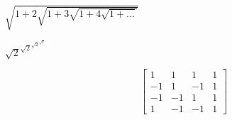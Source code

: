 \documentclass{article}
\begin{document}
	
	$\sqrt{1+2\sqrt{1+3\sqrt{1+4\sqrt{1+...}}}}$
	
	$\sqrt{2}^{\sqrt{2}^{\sqrt{2}^{\sqrt{2}^{...}}}}$
	
	\[
	\begin{bmatrix}
		1 & 1 & 1 & 1 \\
		-1 & 1 & -1 & 1 \\
		-1 & -1 & 1 & 1 \\
		1 & -1 & -1 & 1
	\end{bmatrix}
	\]
\end{document}
